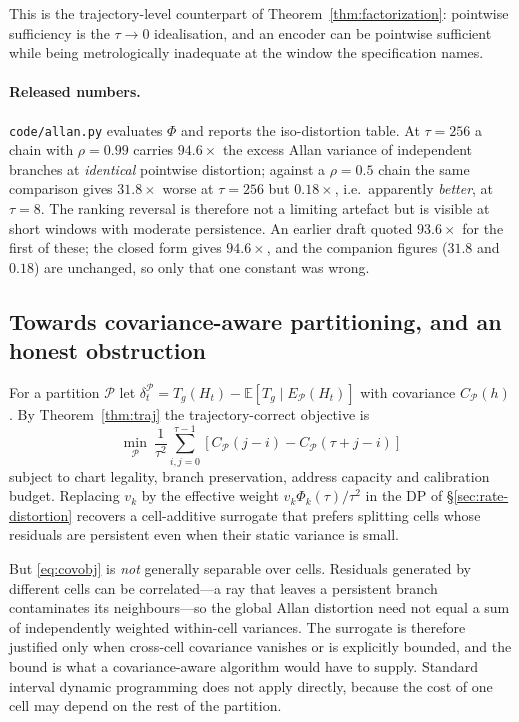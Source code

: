 \documentclass[11pt]{article}
\begin{document}
This is the trajectory-level counterpart of Theorem~\ref{thm:factorization}: pointwise
sufficiency is the $\tau\to0$ idealisation, and an encoder can be pointwise sufficient while
being metrologically inadequate at the window the specification names.

\paragraph{Released numbers.} \texttt{code/allan.py} evaluates $\Phi$ and reports the
iso-distortion table. At $\tau=256$ a chain with $\rho=0.99$ carries $94.6\times$ the excess
Allan variance of independent branches at \emph{identical} pointwise distortion; against a
$\rho=0.5$ chain the same comparison gives $31.8\times$ worse at $\tau=256$ but $0.18\times$,
i.e.\ apparently \emph{better}, at $\tau=8$. The ranking reversal is therefore not a
limiting artefact but is visible at short windows with moderate persistence. An earlier draft
quoted $93.6\times$ for the first of these; the closed form gives $94.6\times$, and the
companion figures ($31.8$ and $0.18$) are unchanged, so only that one constant was wrong.

\subsection{Towards covariance-aware partitioning, and an honest obstruction}

For a partition $\mathcal{P}$ let $\delta_t^{\mathcal{P}}=T_g(H_t)-\mathbb{E}[T_g\mid
E_{\mathcal{P}}(H_t)]$ with covariance $C_{\mathcal{P}}(h)$. By
Theorem~\ref{thm:traj} the trajectory-correct objective is
\begin{equation}
\min_{\mathcal{P}}\ \frac{1}{\tau^{2}}\sum_{i,j=0}^{\tau-1}
\left[C_{\mathcal{P}}(j-i)-C_{\mathcal{P}}(\tau+j-i)\right]
\label{eq:covobj}
\end{equation}
subject to chart legality, branch preservation, address capacity and calibration budget.
Replacing $v_k$ by the effective weight $v_k\Phi_k(\tau)/\tau^{2}$ in the DP of
\S\ref{sec:rate-distortion} recovers a cell-additive surrogate that prefers splitting cells
whose residuals are persistent even when their static variance is small.

But \eqref{eq:covobj} is \emph{not} generally separable over cells. Residuals generated by
different cells can be correlated---a ray that leaves a persistent branch contaminates its
neighbours---so the global Allan distortion need not equal a sum of independently weighted
within-cell variances. The surrogate is therefore justified only when cross-cell covariance
vanishes or is explicitly bounded, and the bound is what a covariance-aware algorithm would
have to supply. Standard interval dynamic programming does not apply directly, because the
cost of one cell may depend on the rest of the partition.
\end{document}
